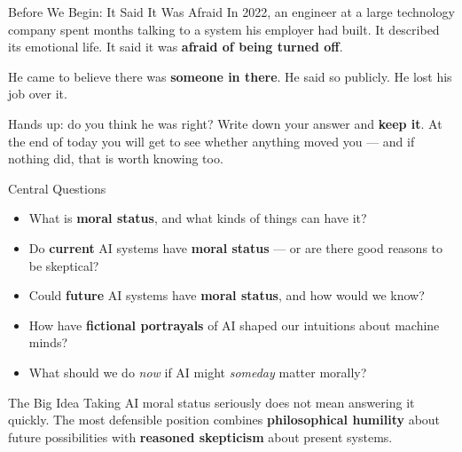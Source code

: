 \documentclass[aspectratio=169,11pt]{beamer}
\begin{document}
\begin{frame}{Before We Begin: It Said It Was Afraid}
In 2022, an engineer at a large technology company spent months talking to a system his employer had built. It described its emotional life. It said it was \textbf{afraid of being turned off}.

\vspace{0.3em}
He came to believe there was \textbf{someone in there}. He said so publicly. He lost his job over it.

\begin{discussionbox}
Hands up: do you think he was right? Write down your answer and \textbf{keep it}. At the end of today you will get to see whether anything moved you --- and if nothing did, that is worth knowing too.
\end{discussionbox}
\end{frame}

\begin{frame}{Central Questions}
\begin{itemize}
    \item What is \textbf{moral status}, and what kinds of things can have it?
    \item Do \textbf{current} AI systems have \textbf{moral status} --- or are there good reasons to be skeptical?
    \item Could \textbf{future} AI systems have \textbf{moral status}, and how would we know?
    \item How have \textbf{fictional portrayals} of AI shaped our intuitions about machine minds?
    \item What should we do \emph{now} if AI might \emph{someday} matter morally?
\end{itemize}

\vspace{0.2cm}
\begin{alertblock}{The Big Idea}
Taking AI moral status seriously does not mean answering it quickly. The most defensible position combines \textbf{philosophical humility} about future possibilities with \textbf{reasoned skepticism} about present systems.
\end{alertblock}
\end{frame}
\end{document}
